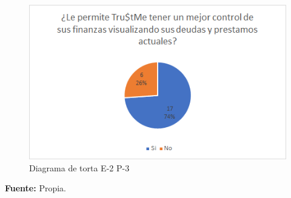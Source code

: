 {{			\begin{figure}[H]
				\centering
				\includegraphics[width=0.8\linewidth]{annexes/e2-p3.png}
				\caption{Diagrama de torta E-2 P-3}
			\end{figure}
			\begin{center}
				\textbf{Fuente:} Propia.
			\end{center}
		}
		
	}
	

	